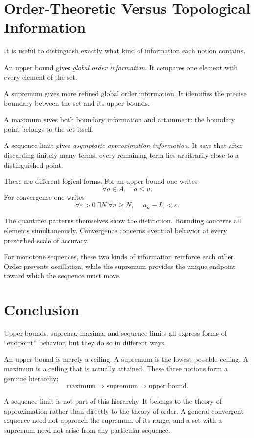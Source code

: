 \documentclass{essay}
\begin{document}
\section{Order-Theoretic Versus Topological Information}

It is useful to distinguish exactly what kind of information each notion contains.

An upper bound gives \emph{global order information}. It compares one element with every element of the set.

A supremum gives more refined global order information. It identifies the precise boundary between the set and its upper bounds.

A maximum gives both boundary information and attainment: the boundary point belongs to the set itself.

A sequence limit gives \emph{asymptotic approximation information}. It says that after discarding finitely many terms, every remaining term lies arbitrarily close to a distinguished point.

These are different logical forms. For an upper bound one writes
\[
    \forall a\in A,\quad a\leq u.
\]
For convergence one writes
\[
    \forall\varepsilon>0\ \exists N\ \forall n\geq N,
    \quad |a_n-L|<\varepsilon.
\]

The quantifier patterns themselves show the distinction. Bounding concerns all elements simultaneously. Convergence concerns eventual behavior at every prescribed scale of accuracy.

For monotone sequences, these two kinds of information reinforce each other. Order prevents oscillation, while the supremum provides the unique endpoint toward which the sequence must move.

\section{Conclusion}

Upper bounds, suprema, maxima, and sequence limits all express forms of ``endpoint'' behavior, but they do so in different ways.

An upper bound is merely a ceiling. A supremum is the lowest possible ceiling. A maximum is a ceiling that is actually attained. These three notions form a genuine hierarchy:
\[
    \text{maximum}\Longrightarrow\text{supremum}\Longrightarrow\text{upper bound}.
\]

A sequence limit is not part of this hierarchy. It belongs to the theory of approximation rather than directly to the theory of order. A general convergent sequence need not approach the supremum of its range, and a set with a supremum need not arise from any particular sequence.
\end{document}
